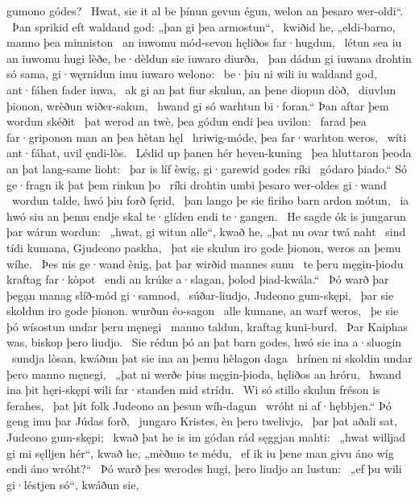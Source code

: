 gumono gódes? \hld\ Hwat, sie it al be þínun gevun égun,
welon an þesaro wer-oldi“. \hld\ Þan sprikid eft waldand god:
„þan gi þea armostun“, \hld\ kwiðid he, „eldi-barno,
manno þea minniston \hld\ an iuwomu mód-sevon
hęliðos far·hugdun, \hld\ létun sea iu an iuwomu hugi lèðe,
be·dèldun sie iuwaro diurða, \hld\ þan dádun gi iuwana drohtin só sama,
gi·węrnidun imu iuwaro welono: \hld\ be·þiu ni wili iu waldand god,
ant·fáhen fader iuwa, \hld\ ak gi an þat fiur skulun,
an þene diopun dòð, \hld\ diuvlun þionon,
wrèðun wiðer-sakun, \hld\ hwand gi só warhtun bi·foran.“
Þan aftar þem wordun skéðit \hld\ þat werod an twè,
þea gódun endi þea uvilon: \hld\ farad þea far·griponon man
an þea hètan hęl \hld\ hriwig-móde,
þea far·warhton weros, \hld\ wíti ant·fáhat,
uvil ęndi-lòs. \hld\ Lédid up þanen
hér heven-kuning \hld\ þea hluttaron þeoda
an þat lang-same lioht: \hld\ þar is líf èwig,
gi·garewid godes ríki \hld\ gódaro þiado.“
Só ge·fragn ik þat þem rinkun þo \hld\ ríki drohtin
umbi þesaro wer-oldes gi·wand \hld\ wordun talde,
hwó þiu forð fęrid, \hld\ þan lango þe sie firiho barn
ardon mótun, \hld\ ia hwó siu an þemu endje skal
te·glíden endi te·gangen. \hld\ He sagde ók is jungarun þar
wárun wordun: \hld\ „hwat, gi witun alle“, kwað he,
„þat nu ovar twá naht \hld\ sind tídi kumana,
Gjudeono paskha, \hld\ þat sie skulun iro gode þionon,
weros an þemu wíhe. \hld\ Þes nis ge·wand ènig,
þat þar wirðid mannes sunu \hld\ te þeru męgin-þiodu
kraftag far·kòpot \hld\ endi an krúke a·slagan,
þolod þiad-kwála.“ \hld\ Þó warð þar þegạn manag
slíð-mód gi·samnod, \hld\ súðar-liudjo,
Judeono gum-skępi, \hld\ þar sie skoldun iro gode þionon.
wurðun éo-sagon \hld\ alle kumane,
an warf weros, \hld\ þe sie þó wísostun
undar þeru męnegi \hld\ manno taldun,
kraftag kuni-burd. \hld\ Þar Kaiphas was,
biskop þero liudjo. \hld\ Sie rédun þó an þat barn godes,
hwó sie ina a·sluogin \hld\ sundja lòsan,
kwáðun þat sie ina an þemu hèlagon daga \hld\ hrínen ni skoldin
undar þero manno męnegi, \hld\ „þat ni werðe þius męgin-þioda,
hęliðos an hróru, \hld\ hwand ina þit hęri-skępi wili
far·standen mid strídu. \hld\ Wi só stillo skulun
fréson is ferahes, \hld\ þat þit folk Judeono
an þesun wíh-dagun \hld\ wróht ni af·hębbjen.“
Þó geng imu þar Júdas forð, \hld\ jungaro Kristes,
èn þero twelivjo, \hld\ þar þat aðali sat,
Judeono gum-skępi; \hld\ kwað þat he is im gódan rád
sęggjan mahti: \hld\ „hwat willjad gi mi sęlljen hér“, kwað he,
„mèðmo te médu, \hld\ ef ik iu þene man givu
áno wíg endi áno wróht?“ \hld\ Þó warð þes werodes hugi,
þero liudjo an lustun: \hld\ „ef þu wili gi·léstjen só“, kwáðun sie,
